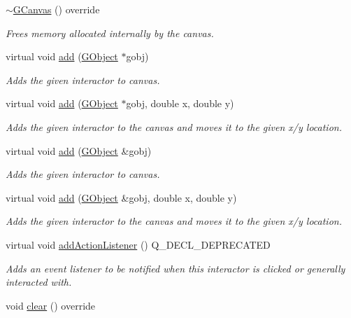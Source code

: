 \begin{DoxyCompactItemize}
\mbox{\hyperlink{classGCanvas_af7574c14a3a729c56863e9c4ab6a6787}{$\sim$\+G\+Canvas}} () override
\begin{DoxyCompactList}\small\item\em Frees memory allocated internally by the canvas. \end{DoxyCompactList}\item 
virtual void \mbox{\hyperlink{classGCanvas_afe8277e7b2627513c6f7452fb0b2847d}{add}} (\mbox{\hyperlink{classGObject}{G\+Object}} $\ast$gobj)
\begin{DoxyCompactList}\small\item\em Adds the given interactor to canvas. \end{DoxyCompactList}\item 
virtual void \mbox{\hyperlink{classGCanvas_a8bb36f245efc7806414a1339c2befa1c}{add}} (\mbox{\hyperlink{classGObject}{G\+Object}} $\ast$gobj, double x, double y)
\begin{DoxyCompactList}\small\item\em Adds the given interactor to the canvas and moves it to the given x/y location. \end{DoxyCompactList}\item 
virtual void \mbox{\hyperlink{classGCanvas_ac732fc2123d7a6d7e2de145fe9bbd8e8}{add}} (\mbox{\hyperlink{classGObject}{G\+Object}} \&gobj)
\begin{DoxyCompactList}\small\item\em Adds the given interactor to canvas. \end{DoxyCompactList}\item 
virtual void \mbox{\hyperlink{classGCanvas_a5b11b532869632a6c26b098b0858eac5}{add}} (\mbox{\hyperlink{classGObject}{G\+Object}} \&gobj, double x, double y)
\begin{DoxyCompactList}\small\item\em Adds the given interactor to the canvas and moves it to the given x/y location. \end{DoxyCompactList}\item 
virtual void \mbox{\hyperlink{classGInteractor_a02f20ea6edfa0671f31c4c648a253833}{add\+Action\+Listener}} () Q\+\_\+\+D\+E\+C\+L\+\_\+\+D\+E\+P\+R\+E\+C\+A\+T\+ED
\begin{DoxyCompactList}\small\item\em Adds an event listener to be notified when this interactor is clicked or generally interacted with. \end{DoxyCompactList}\item 
void \mbox{\hyperlink{classGCanvas_aee7cb2065b88d21ac4ad05bc997ecf82}{clear}} () override

\end{DoxyCompactItemize}
